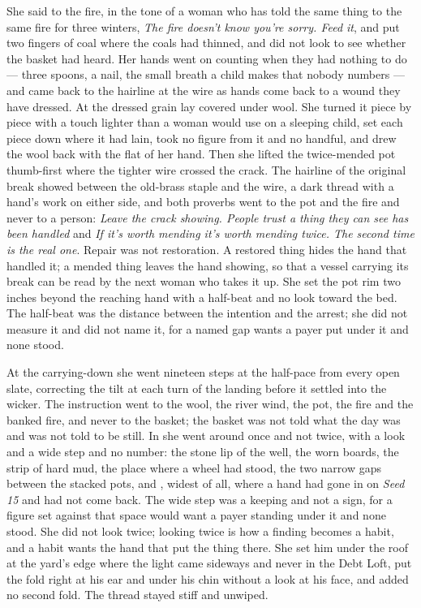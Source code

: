 She said to the fire, in the tone of a woman who has told the same thing to the same fire for three winters, \emph{The fire doesn't know you're sorry. Feed it}, and put two fingers of coal where the coals had thinned, and did not look to see whether the basket had heard. Her hands went on counting when they had nothing to do --- three spoons, a nail, the small breath a child makes that nobody numbers --- and came back to the hairline at the wire as hands come back to a wound they have dressed. At  the dressed grain lay covered under wool. She turned it piece by piece with a touch lighter than a woman would use on a sleeping child, set each piece down where it had lain, took no figure from it and no handful, and drew the wool back with the flat of her hand. Then she lifted the twice-mended pot thumb-first where the tighter wire crossed the crack. The hairline of the original break showed between the old-brass staple and the wire, a dark thread with a hand's work on either side, and both proverbs went to the pot and the fire and never to a person: \emph{Leave the crack showing. People trust a thing they can see has been handled} and \emph{If it's worth mending it's worth mending twice. The second time is the real one}. Repair was not restoration. A restored thing hides the hand that handled it; a mended thing leaves the hand showing, so that a vessel carrying its break can be read by the next woman who takes it up. She set the pot rim two inches beyond the reaching hand with a half-beat and no look toward the bed. The half-beat was the distance between the intention and the arrest; she did not measure it and did not name it, for a named gap wants a payer put under it and none stood.

At the carrying-down she went nineteen steps at the half-pace from every open slate, correcting the tilt at each turn of the landing before it settled into the wicker. The instruction went to the wool, the river wind, the pot, the fire and the banked fire, and never to the basket; the basket was not told what the day was and was not told to be still. In  she went around  once and not twice, with a look and a wide step and no number: the stone lip of the well, the worn boards, the strip of hard mud, the place where a wheel had stood, the two narrow gaps between the stacked pots, and , widest of all, where a hand had gone in on \emph{Seed 15} and had not come back. The wide step was a keeping and not a sign, for a figure set against that space would want a payer standing under it and none stood. She did not look twice; looking twice is how a finding becomes a habit, and a habit wants the hand that put the thing there. She set him under the roof at the yard's edge where the light came sideways and never in the Debt Loft, put the fold right at his ear and under his chin without a look at his face, and added no second fold. The thread stayed stiff and unwiped.

